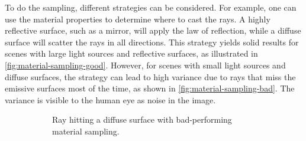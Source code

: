 To do the sampling, different strategies can be considered. For example, one can use the material properties to determine where to cast the rays. A highly reflective surface, such as a mirror, will apply the law of reflection, while a diffuse surface will scatter the rays in all directions. This strategy yields solid results for scenes with large light sources and reflective surfaces, as illustrated in \autoref{fig:material-sampling-good}. However, for scenes with small light sources and diffuse surfaces, the strategy can lead to high variance due to rays that miss the emissive surfaces most of the time, as shown in \autoref{fig:material-sampling-bad}. The variance is visible to the human eye as noise in the image.

\begin{figure}[H]
  \centering
  \begin{subfigure}[t]{0.45\textwidth}
    \centering
    \caption{Ray hitting a diffuse surface with bad-performing material sampling.}
    \label{fig:material-sampling-bad}
  \end{subfigure}
  \hfill
  \begin{subfigure}[t]{0.45\textwidth}
    \centering
\end{subfigure}
\end{figure}
